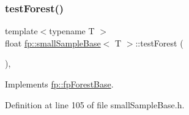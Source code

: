 \subsubsection{\texorpdfstring{test\+Forest()}{testForest()}}
{\footnotesize\ttfamily template$<$typename T $>$ \\
float \hyperlink{classfp_1_1smallSampleBase}{fp\+::small\+Sample\+Base}$<$ T $>$\+::test\+Forest (\begin{DoxyParamCaption}{ }\end{DoxyParamCaption})\hspace{0.3cm}{\ttfamily [inline]}, {\ttfamily [virtual]}}



Implements \hyperlink{classfp_1_1fpForestBase_af7becba028a198f650841b718d16ed16}{fp\+::fp\+Forest\+Base}.



Definition at line 105 of file small\+Sample\+Base.\+h.


